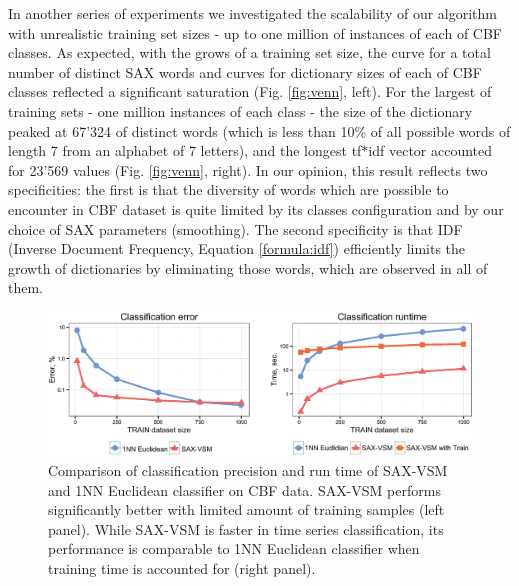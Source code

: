 In another series of experiments we investigated the scalability of our algorithm with
unrealistic training set sizes - up to one million of instances of each of CBF classes.
As expected, with the grows of a training set size, the curve for a total number of distinct SAX
words and curves for dictionary sizes of each of CBF classes reflected a significant saturation 
(Fig. \ref{fig:venn}, left). For the largest of training sets - one million instances of each
class - the size of the dictionary peaked at 67'324 of distinct words (which is less than 10\% of
all possible words of length 7 from an alphabet of 7 letters), and the longest tf$\ast$idf vector 
accounted for 23'569 values (Fig. \ref{fig:venn}, right). In our opinion, this result reflects two
specificities: the first is that the diversity of words which are possible to encounter in 
CBF dataset is quite limited by its classes configuration and by our choice of SAX 
parameters (smoothing). 
The second specificity is that IDF (Inverse Document Frequency, Equation \ref{formula:idf})
efficiently limits the growth of dictionaries by eliminating those words, which are observed in all
of them.

\begin{figure}[t]
   \centering
   \includegraphics[width=140mm]{figures/precision-runtime.eps}
   \caption{Comparison of classification precision and run time of SAX-VSM and 1NN 
   Euclidean classifier on CBF data. SAX-VSM performs significantly better with limited 
   amount of training samples (left panel). While SAX-VSM is faster in time series 
   classification, its performance is comparable to 1NN Euclidean classifier when 
   training time is accounted for (right panel).}
   \label{fig:precision-runtime}
\end{figure}

